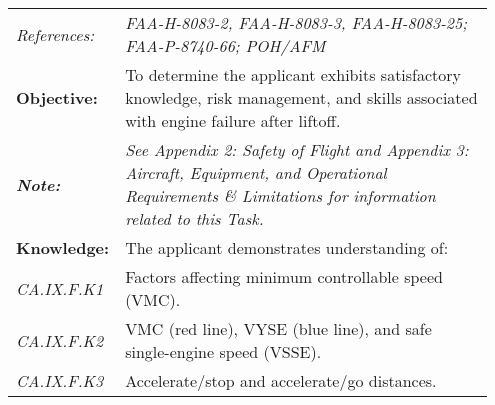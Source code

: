 \begin{table}[H]
\centering
\begin{tabular}%
  {>{\raggedleft\arraybackslash}p{0.15\linewidth}%
   >{\raggedright\arraybackslash}p{0.8\linewidth}%
  }
\textit{References:}                                                                    & \textit{FAA-H-8083-2, FAA-H-8083-3, FAA-H-8083-25; FAA-P-8740-66; POH/AFM}                                                                                                                                                 \\
\textbf{Objective:}                                                                     & To determine the applicant exhibits satisfactory knowledge, risk management, and skills associated with engine failure after liftoff.                                                                                      \\
\textit{\textbf{Note:}}                                                                 & \textit{See Appendix 2: Safety of Flight and Appendix 3: Aircraft, Equipment, and Operational Requirements \& Limitations for information related to this Task.}                                                           \\ \hline
\textbf{Knowledge:}                                                                     & The applicant demonstrates understanding of:                                                                                                                                                                               \\
\textit{CA.IX.F.K1}                                                                     & Factors affecting minimum controllable speed (VMC).                                                                                                                                                                        \\
\textit{CA.IX.F.K2}                                                                     & VMC (red line), VYSE (blue line), and safe single-engine speed (VSSE).                                                                                                                                                     \\
\textit{CA.IX.F.K3}                                                                     & Accelerate/stop and accelerate/go distances.                                                                                                                                                                               \\

\end{tabular}
\end{table}
